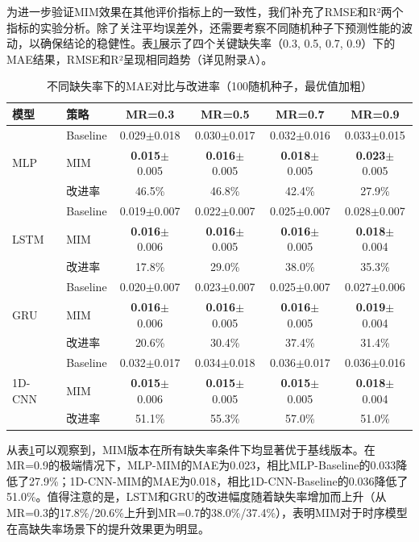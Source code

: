 \documentclass[10pt,a4paper]{ctexart}
\begin{document}
为进一步验证MIM效果在其他评价指标上的一致性，我们补充了RMSE和R²两个指标的实验分析。除了关注平均误差外，还需要考察不同随机种子下预测性能的波动，以确保结论的稳健性。表\ref{tab:full_results}展示了四个关键缺失率（0.3, 0.5, 0.7, 0.9）下的MAE结果，RMSE和R²呈现相同趋势（详见附录A）。

\begin{table}[H]
\centering
\small
\caption{不同缺失率下的MAE对比与改进率（100随机种子，最优值加粗）}
\label{tab:full_results}
\begin{tabular}{@{}llcccc@{}}
\toprule
\textbf{模型} & \textbf{策略} & \textbf{MR=0.3} & \textbf{MR=0.5} & \textbf{MR=0.7} & \textbf{MR=0.9} \\
\midrule
\multirow{3}{*}{MLP} 
& Baseline & 0.029$\pm$0.018 & 0.030$\pm$0.017 & 0.032$\pm$0.016 & 0.033$\pm$0.015 \\
& MIM & \textbf{0.015}$\pm$0.005 & \textbf{0.016}$\pm$0.005 & \textbf{0.018}$\pm$0.005 & \textbf{0.023}$\pm$0.005 \\
& 改进率 & 46.5\% & 46.8\% & 42.4\% & 27.9\% \\
\midrule
\multirow{3}{*}{LSTM} 
& Baseline & 0.019$\pm$0.007 & 0.022$\pm$0.007 & 0.025$\pm$0.007 & 0.028$\pm$0.007 \\
& MIM & \textbf{0.016}$\pm$0.006 & \textbf{0.016}$\pm$0.005 & \textbf{0.016}$\pm$0.005 & \textbf{0.018}$\pm$0.004 \\
& 改进率 & 17.8\% & 29.0\% & 38.0\% & 35.3\% \\
\midrule
\multirow{3}{*}{GRU} 
& Baseline & 0.020$\pm$0.007 & 0.023$\pm$0.007 & 0.025$\pm$0.007 & 0.027$\pm$0.006 \\
& MIM & \textbf{0.016}$\pm$0.006 & \textbf{0.016}$\pm$0.005 & \textbf{0.016}$\pm$0.005 & \textbf{0.019}$\pm$0.004 \\
& 改进率 & 20.6\% & 30.4\% & 37.4\% & 31.4\% \\
\midrule
\multirow{3}{*}{1D-CNN} 
& Baseline & 0.032$\pm$0.017 & 0.034$\pm$0.018 & 0.036$\pm$0.017 & 0.036$\pm$0.016 \\
& MIM & \textbf{0.015}$\pm$0.006 & \textbf{0.015}$\pm$0.005 & \textbf{0.015}$\pm$0.005 & \textbf{0.018}$\pm$0.004 \\
& 改进率 & 51.1\% & 55.3\% & 57.0\% & 51.0\% \\
\bottomrule
\end{tabular}
\end{table}

从表\ref{tab:full_results}可以观察到，MIM版本在所有缺失率条件下均显著优于基线版本。在MR=0.9的极端情况下，MLP-MIM的MAE为0.023，相比MLP-Baseline的0.033降低了27.9\%；1D-CNN-MIM的MAE为0.018，相比1D-CNN-Baseline的0.036降低了51.0\%。值得注意的是，LSTM和GRU的改进幅度随着缺失率增加而上升（从MR=0.3的17.8\%/20.6\%上升到MR=0.7的38.0\%/37.4\%），表明MIM对于时序模型在高缺失率场景下的提升效果更为明显。
\end{document}
